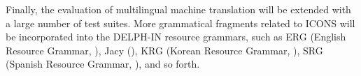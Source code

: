 

Finally, the evaluation of multilingual machine translation will be
extended with a large number of test suites. More grammatical
fragments related to ICONS will be incorporated into the
DELPH-IN resource grammars, such as ERG (English Resource Grammar,
\citealt{flickinger:00}), Jacy (\citealt{siegel:bender:02}), KRG
(Korean Resource Grammar, \citealt{kim:etal:11}), SRG (Spanish
Resource Grammar, \citealt{marimon:12}), and so forth.




